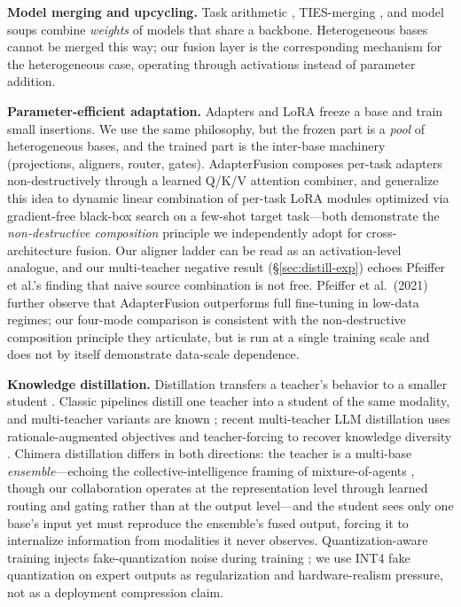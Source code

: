 \documentclass[10pt,twoside]{article}
\theoremstyle{definition}
\begin{document}
\textbf{Model merging and upcycling.} Task arithmetic \citep{ilharco2023}, TIES-merging \citep{yadav2023}, and model soups \citep{wortsman2022} combine \emph{weights} of models that share a backbone. Heterogeneous bases cannot be merged this way; our fusion layer is the corresponding mechanism for the heterogeneous case, operating through activations instead of parameter addition.

\textbf{Parameter-efficient adaptation.} Adapters \citep{houlsby2019} and LoRA \citep{hu2022} freeze a base and train small insertions. We use the same philosophy, but the frozen part is a \emph{pool} of heterogeneous bases, and the trained part is the inter-base machinery (projections, aligners, router, gates). AdapterFusion \citep{pfeiffer2021} composes per-task adapters non-destructively through a learned Q/K/V attention combiner, and \citet{huang2024lorahub} generalize this idea to dynamic linear combination of per-task LoRA modules optimized via gradient-free black-box search on a few-shot target task---both demonstrate the \emph{non-destructive composition} principle we independently adopt for cross-architecture fusion. Our aligner ladder can be read as an activation-level analogue, and our multi-teacher negative result (\S\ref{sec:distill-exp}) echoes Pfeiffer et al.'s finding that naive source combination is not free. Pfeiffer et al.\ (2021) further observe that AdapterFusion outperforms full fine-tuning in low-data regimes; our four-mode comparison is consistent with the non-destructive composition principle they articulate, but is run at a single training scale and does not by itself demonstrate data-scale dependence.

\textbf{Knowledge distillation.} Distillation transfers a teacher's behavior to a smaller student \citep{hintonDistillingKnowledgeNeural2015,sanh2019,gou2021}. Classic pipelines distill one teacher into a student of the same modality, and multi-teacher variants are known \citep{you2017}; recent multi-teacher LLM distillation uses rationale-augmented objectives and teacher-forcing to recover knowledge diversity \citep{tian2025tinyllm}. Chimera distillation differs in both directions: the teacher is a multi-base \emph{ensemble}---echoing the collective-intelligence framing of mixture-of-agents \citep{wang2024moa}, though our collaboration operates at the representation level through learned routing and gating rather than at the output level---and the student sees only one base's input yet must reproduce the ensemble's fused output, forcing it to internalize information from modalities it never observes. Quantization-aware training injects fake-quantization noise during training \citep{dettmers2022}; we use INT4 fake quantization on expert outputs as regularization and hardware-realism pressure, not as a deployment compression claim.
\end{document}
